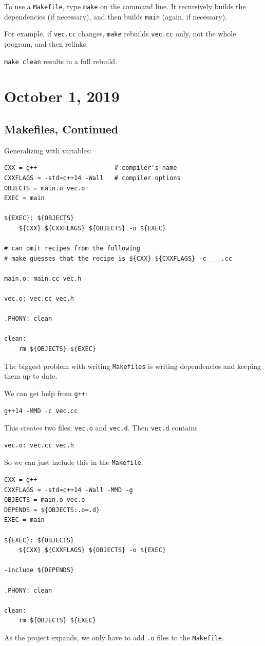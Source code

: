 \documentclass[11pt]{article}
\theoremstyle{definition}
\begin{document}
To use a {\tt Makefile}, type {\tt make} on the command line. It recursively builds the dependencies (if necessary), and then builds {\tt main} (again, if necessary). 

For example, if {\tt vec.cc} changes, {\tt make} rebuilds {\tt vec.cc} only, not the whole program, and then relinks.

{\tt make clean} results in a full rebuild.
\newpage
\section{October 1, 2019}

\subsection{Makefiles, Continued}
Generalizing with variables:
\begin{verbatim}
CXX = g++                     # compiler's name
CXXFLAGS = -std=c++14 -Wall   # compiler options
OBJECTS = main.o vec.o
EXEC = main

${EXEC}: ${OBJECTS}
    ${CXX} ${CXXFLAGS} ${OBJECTS} -o ${EXEC}
    
# can omit recipes from the following
# make guesses that the recipe is ${CXX} ${CXXFLAGS} -c ___.cc

main.o: main.cc vec.h

vec.o: vec.cc vec.h   

.PHONY: clean

clean:
    rm ${OBJECTS} ${EXEC}
\end{verbatim}
The biggest problem with writing {\tt Makefiles} is writing dependencies and keeping them up to date.

We can get help from {\tt g++}:
\begin{verbatim}
g++14 -MMD -c vec.cc
\end{verbatim}
This creates two files: {\tt vec.o} and {\tt vec.d}. Then {\tt vec.d} contains
\begin{verbatim}
vec.o: vec.cc vec.h
\end{verbatim}
So we can just include this in the {\tt Makefile}.
\begin{verbatim}
CXX = g++
CXXFLAGS = -std=c++14 -Wall -MMD -g
OBJECTS = main.o vec.o
DEPENDS = ${OBJECTS:.o=.d}
EXEC = main

${EXEC}: ${OBJECTS}
    ${CXX} ${CXXFLAGS} ${OBJECTS} -o ${EXEC}

-include ${DEPENDS}

.PHONY: clean

clean:
    rm ${OBJECTS} ${EXEC}
\end{verbatim}
As the project expands, we only have to add {\tt .o} files to the {\tt Makefile}.
\end{document}
